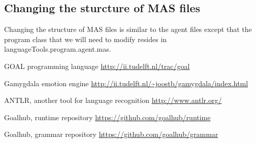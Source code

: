 \documentclass[]{article}
\begin{document}
\subsection{Changing the sturcture of MAS files}
Changing the structure of MAS files is similar to the agent files except that the program class that we will need to modify resides in languageTools.program.agent.mas.

\clearpage
\printglossaries

\begin{thebibliography}{9}
	
	GOAL programming language
	\url{http://ii.tudelft.nl/trac/goal}
	
	Gamygdala emotion engine
	\url{http://ii.tudelft.nl/~joostb/gamygdala/index.html}
	
	ANTLR, another tool for language recognition
	\url{http://www.antlr.org/}
	
	Goalhub, runtime repository
	\url{https://github.com/goalhub/runtime}
	
	Goalhub, grammar repository
	\url{https://github.com/goalhub/grammar}
		
	
	
\end{thebibliography}
\end{document}
